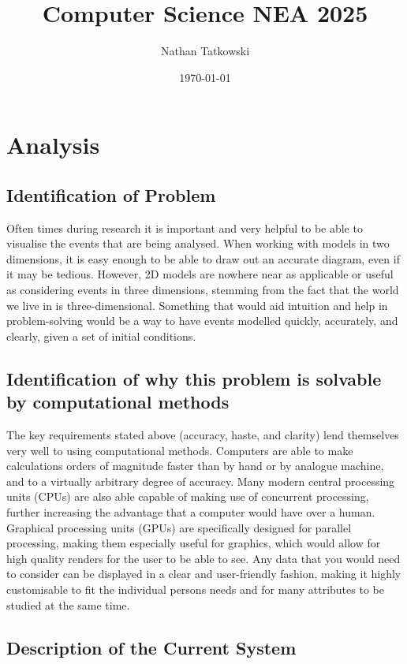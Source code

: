 \documentclass[11pt]{article}
\title{Computer Science NEA 2025}
\author{Nathan Tatkowski}
\date{\today}
\begin{document}
    \pagestyle{fancy}
    \setlength{\headheight}{13.6pt}
    \maketitle
    \pagebreak
    \tableofcontents
    \pagebreak


    \section{Analysis}
        \subsection{Identification of Problem}
            Often times during research it is important and very helpful to be able to visualise the events that are being analysed. When working with models in two dimensions, it is easy enough to be able to draw out an accurate diagram, even if it may be tedious. However, 2D models are nowhere near as applicable or useful as considering events in three dimensions, stemming from the fact that the world we live in is three-dimensional. Something that would aid intuition and help in problem-solving would be a way to have events modelled quickly, accurately, and clearly, given a set of initial conditions.

        \subsection{Identification of why this problem is solvable by computational methods}
            The key requirements stated above (accuracy, haste, and clarity) lend themselves very well to using computational methods. Computers are able to make calculations orders of magnitude faster than by hand or by analogue machine, and to a virtually arbitrary degree of accuracy. Many modern central processing units (CPUs) are also able capable of making use of concurrent processing, further increasing the advantage that a computer would have over a human. Graphical processing units (GPUs) are specifically designed for parallel processing, making them especially useful for graphics, which would allow for high quality renders for the user to be able to see. Any data that you would need to consider can be displayed in a clear and user-friendly fashion, making it highly customisable to fit the individual persons needs and for many attributes to be studied at the same time.
        \subsection{Description of the Current System}
\end{document}
